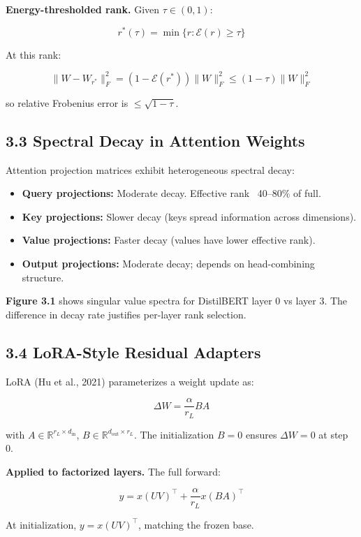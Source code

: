 \textbf{Energy-thresholded rank.} Given $\tau \in (0, 1)$:

\[
r^*(\tau) = \min\{r : \mathcal{E}(r) \geq \tau\}
\tag{3.5}
\]

At this rank:

\[
\|W - W_{r^*}\|_F^2 = (1 - \mathcal{E}(r^*)) \|W\|_F^2 \leq (1 - \tau) \|W\|_F^2
\tag{3.6}
\]

so relative Frobenius error is $\leq \sqrt{1 - \tau}$.

\subsection{3.3 Spectral Decay in Attention Weights}

Attention projection matrices exhibit heterogeneous spectral decay:

\begin{itemize}
\item \textbf{Query projections:} Moderate decay. Effective rank ~40--80\% of full.
\item \textbf{Key projections:} Slower decay (keys spread information across dimensions).
\item \textbf{Value projections:} Faster decay (values have lower effective rank).
\item \textbf{Output projections:} Moderate decay; depends on head-combining structure.
\end{itemize}

\textbf{Figure 3.1} shows singular value spectra for DistilBERT layer 0 vs layer 3. 
The difference in decay rate justifies per-layer rank selection.

\subsection{3.4 LoRA-Style Residual Adapters}

LoRA (Hu et al., 2021) parameterizes a weight update as:

\[
\Delta W = \frac{\alpha}{r_L} B A
\tag{3.7}
\]

with $A \in \mathbb{R}^{r_L \times d_\text{in}}$, $B \in \mathbb{R}^{d_\text{out} \times r_L}$. 
The initialization $B = 0$ ensures $\Delta W = 0$ at step 0.

\textbf{Applied to factorized layers.} The full forward:

\[
y = x (U V)^\top + \frac{\alpha}{r_L} x (B A)^\top
\tag{3.8}
\]

At initialization, $y = x (U V)^\top$, matching the frozen base.

